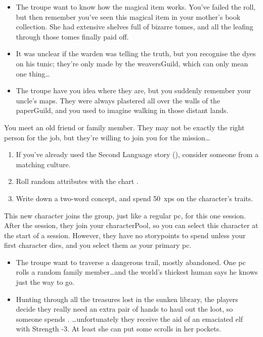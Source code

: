 \begin{multicols}{2}
\begin{itemize}
  \item
  The troupe want to know how the magical item works.
  You've failed the roll, but then remember you've seen this magical item in your mother's book collection.
  She had extensive shelves full of bizarre tomes, and all the leafing through those tomes finally paid off.
  \item
  It was unclear if the \gls{warden} was telling the truth, but you recognise the dyes on his tunic; they're only made by the \gls{weaversGuild}, which can only mean one thing\ldots
  \item
  The troupe have you idea where they are, but you suddenly remember your uncle's maps.
  They were always plastered all over the walls of the \gls{paperGuild}, and you used to imagine walking in those distant lands.
\end{itemize}

\label{oldFriend}
You meet an old friend or family member.
They may not be exactly the right person for the job, but they're willing to join you for the mission\ldots

\begin{enumerate}
  \item
  If you've already used the Second Language story (), consider someone from a matching culture.
  \item
  Roll random \glspl{attribute} with the chart .
  \item
  Write down a two-word concept, and spend 50~\glspl{xp} on the character's \glspl{trait}.
\end{enumerate}

This new character joins the group, just like a regular \gls{pc}, for this one session.
After the session, they join your \gls{characterPool}, so you can select this character at the start of a session.
However, they have no \glspl{storypoint} to spend unless your first character dies, and you select them as your primary \gls{pc}.

\begin{itemize}
  \item
  The troupe want to traverse a dangerous trail, mostly abandoned.
  One \gls{pc} rolls a random family member\ldots and the world's thickest human says he knows just the way to go.
  \item
  Hunting through all the treasures lost in the sunken library, the players decide they really need an extra pair of hands to haul out the loot, so someone spends .
  \ldots unfortunately they receive the aid of an emaciated elf with Strength -3.
  At least she can put some scrolls in her pockets.
\end{itemize}


\end{multicols}
